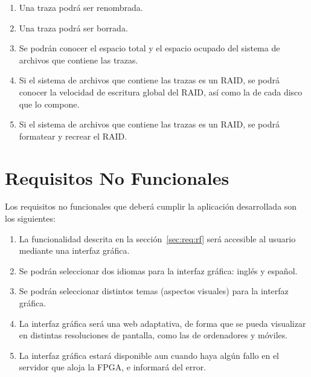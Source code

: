 \begin{enumerate}[align=left,before=\itshape,font=\normalfont,label=\bfseries RF. \arabic*]
  \item Una \gls{traza} podrá ser renombrada.
  \item Una \gls{traza} podrá ser borrada.
  \item Se podrán conocer el espacio total y el espacio ocupado del sistema de archivos que contiene las \glspl{traza}.
  \item Si el sistema de archivos que contiene las \glspl{traza} es un \gls{RAID}, se podrá conocer la velocidad de escritura global del \gls{RAID}, así como la de cada disco que lo compone.
  \item Si el sistema de archivos que contiene las \glspl{traza} es un \gls{RAID}, se podrá formatear y recrear el \gls{RAID}.
\end{enumerate}


\section{Requisitos No Funcionales\label{sec:req:rnf}}

Los requisitos no funcionales que deberá cumplir la aplicación desarrollada son los siguientes:

\begin{enumerate}[align=left,before=\itshape,font=\normalfont,label=\bfseries RNF. \arabic*]
  \item La funcionalidad descrita en la sección~\ref{sec:req:rf} será accesible al usuario mediante una interfaz gráfica.
  \item Se podrán seleccionar dos idiomas para la interfaz gráfica: inglés y español.
  \item Se podrán seleccionar distintos temas (aspectos visuales) para la interfaz gráfica.
  \item La interfaz gráfica será una web adaptativa, de forma que se pueda visualizar en distintas resoluciones de pantalla, como las de ordenadores y móviles.
  \item La interfaz gráfica estará disponible aun cuando haya algún fallo en el servidor que aloja la \gls{FPGA}, e informará del error.
\end{enumerate}
